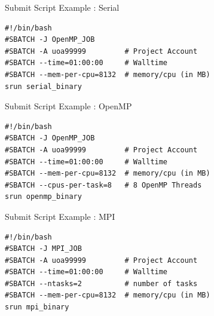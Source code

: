 \documentclass[final,t]{beamer}
\begin{document}
\begin{frame}[fragile]{}
\begin{columns}[t]
\begin{column}{.3\linewidth}
      \begin{block}{Submit Script Example : Serial}
              \vspace*{-3ex}
        \begin{verbatim}
#!/bin/bash
#SBATCH -J OpenMP_JOB
#SBATCH -A uoa99999         # Project Account
#SBATCH --time=01:00:00     # Walltime
#SBATCH --mem-per-cpu=8132  # memory/cpu (in MB)
srun serial_binary
        \end{verbatim}
                \vspace*{-4ex}
      \end{block}

      \begin{block}{Submit Script Example : OpenMP}
              \vspace*{-3ex}
        \begin{verbatim}
#!/bin/bash
#SBATCH -J OpenMP_JOB
#SBATCH -A uoa99999         # Project Account
#SBATCH --time=01:00:00     # Walltime
#SBATCH --mem-per-cpu=8132  # memory/cpu (in MB)
#SBATCH --cpus-per-task=8   # 8 OpenMP Threads
srun openmp_binary
        \end{verbatim}
                \vspace*{-4ex}
      \end{block}

      \begin{block}{Submit Script Example : MPI}
              \vspace*{-3ex}
        \begin{verbatim}
#!/bin/bash
#SBATCH -J MPI_JOB
#SBATCH -A uoa99999         # Project Account
#SBATCH --time=01:00:00     # Walltime
#SBATCH --ntasks=2          # number of tasks
#SBATCH --mem-per-cpu=8132  # memory/cpu (in MB)
srun mpi_binary
        \end{verbatim}
                \vspace*{-4ex}
      \end{block}


\end{column}
\end{columns}
\end{frame}
\end{document}
